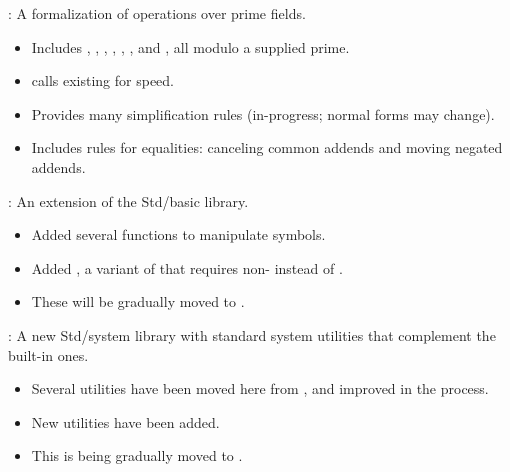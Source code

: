 
\begin{frame}

\newlibtitle

:
A formalization of operations over prime fields.
\begin{itemize}
\item Includes , , , , ,
  , and , all modulo a supplied prime.
\item {} calls existing  for speed.
\item Provides many simplification rules (in-progress; normal forms may change).
\item Includes  rules for equalities: canceling common addends
  and moving negated addends.
\end{itemize}

\end{frame}


\begin{frame}

\newlibtitle

:
An extension of the Std/basic library.
\begin{itemize}
\item
Added several functions to manipulate symbols.
\item
Added , a variant of 
that requires non- instead of .
\item
These will be gradually moved to .
\end{itemize}

\separation

:
A new Std/system library
with standard system utilities
that complement the built-in ones.
\begin{itemize}
\item
Several utilities have been moved here from ,
and improved in the process.
\item
New utilities have been added.
\item
This is being gradually moved to .
\end{itemize}

\end{frame}

